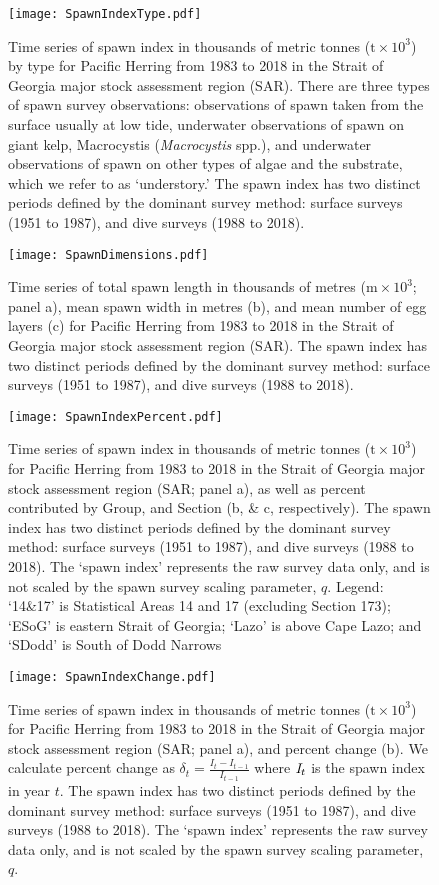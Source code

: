 \documentclass[12pt]{article}\usepackage[]{graphicx}\usepackage[]{color}
\newcommand{\regionName}{Strait of Georgia}
\newcommand{\regionType}{major}
\newcommand{\thisYr}{2018}
\newcommand{\fishName}{Pacific Herring}
\newcommand{\spawnIndex}{The `spawn index' represents the raw survey data only, and is not scaled by the spawn survey scaling parameter, $q$.}
\newcommand{\trendLine}{The thick black line is a loess curve, and the shaded area is the 90\% confidence interval.}
\newcommand{\qPeriods}{The spawn index has two distinct periods defined by the dominant survey method: surface surveys (1951 to 1987), and dive surveys (1988 to 2018).}
\newcommand{\spawnTypes}{There are three types of spawn survey observations: observations of spawn taken from the surface usually at low tide, underwater observations of spawn on giant kelp, Macrocystis (\emph{Macrocystis} spp.), and underwater observations of spawn on other types of algae and the substrate, which we refer to as `understory.'}
\begin{document}
\begin{figure}[h]
\centering
\texttt{[image: SpawnIndexType.pdf]}
\caption{Time series of spawn index in thousands of metric tonnes ($\text{t} \times 10^{3}$) by type for \fishName{} from 1983 to \thisYr{} in the \regionName{} \regionType{} stock assessment region (SAR). 
\spawnTypes{}
\qPeriods{}}
\label{figSpawnIndexType}
\end{figure}

\begin{figure}[h]
\centering
\texttt{[image: SpawnDimensions.pdf]}
\caption{Time series of total spawn length in thousands of metres ($\text{m} \times 10^{3}$; panel a), mean spawn width in metres (b), and mean number of egg layers (c) for \fishName{} from 1983 to \thisYr{} in the \regionName{} \regionType{} stock assessment region (SAR). 
\qPeriods{}}
\label{figSpawnDimensions}
\end{figure}

\begin{figure}[h]
\centering
\texttt{[image: SpawnIndexPercent.pdf]}
\caption{Time series of spawn index in thousands of metric tonnes ($\text{t} \times 10^{3}$) for \fishName{} from 1983 to \thisYr{} in the \regionName{} \regionType{} stock assessment region (SAR; panel a), as well as percent contributed by Group, and Section (b, \& c, respectively). 
\qPeriods{}
\spawnIndex{}
Legend: `14\&17' is Statistical Areas 14 and 17
      (excluding Section 173); `ESoG' is eastern Strait of Georgia; 
      `Lazo' is above Cape Lazo; and `SDodd' is South of Dodd Narrows}
\label{figSpawnIndexPercent}
\end{figure}

\begin{figure}[h]
\centering
\texttt{[image: SpawnIndexChange.pdf]}
\caption{Time series of spawn index in thousands of metric tonnes ($\text{t} \times 10^{3}$) for \fishName{} from 1983 to \thisYr{} in the \regionName{} \regionType{} stock assessment region (SAR; panel a), and percent change (b).
We calculate percent change as $\delta_t=\frac{I_t - I_{t-1}}{I_{t-1}}$ where $\mathit{I}_t$ is the spawn index in year $t$.
\qPeriods{}
\spawnIndex{}}
\label{figSpawnIndexChange}
\end{figure}

\iftoggle{spawnDepth}{
\begin{figure}[h]
\centering
\texttt{[image: SpawnDepthSASec.pdf]}
\caption{Time series of maximum spawn depth in metres (m) for \fishName{} from 1983 to \thisYr{} in the \regionName{} \regionType{} stock assessment region (SAR) by Statistical Area (SA; panel a), and Section (b).
Note that depth is not corrected to the chart datum.
\qPeriods{}}
\label{figSpawnDepth}
\end{figure}
}{\unskip}
\end{document}

